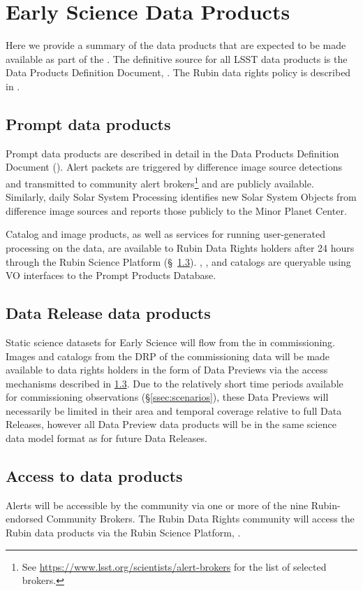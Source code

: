 \section{Early Science Data Products}
\label{sec:data}

Here we provide a summary of the data products that are expected to be made available as part of the \esp.
The definitive source for all LSST data products is the Data Products Definition Document, \citep{LSE-163}.
The Rubin data rights policy is described in  \cite{RDO-013}.


\subsection{Prompt data products}

Prompt data products are described in detail in the Data Products Definition Document (\DPDD).
Alert packets are triggered by difference image source detections and transmitted to community alert brokers\footnote{See \url{https://www.lsst.org/scientists/alert-brokers} for the list of selected brokers.} and are publicly available.
Similarly, daily Solar System Processing identifies new Solar System Objects from difference image sources and reports those publicly to the Minor Planet Center.

Catalog and image products, as well as services for running user-generated processing on the data, are available to Rubin Data Rights holders after 24 hours through the Rubin Science Platform (\S~\ref{ssec:dataaccess}).
\DIASource, \DIAObject, and \SSObject catalogs are queryable using VO interfaces to the Prompt Products Database.

\subsection{Data Release data products}
Static science datasets for Early Science will flow from the \svs in commissioning.
Images and catalogs from the DRP of the commissioning data will be made available to data rights holders in the form of Data Previews via the access mechanisms described in \ref{ssec:dataaccess}.
Due to the relatively short time periods available for commissioning observations (\S \ref{ssec:scenarios}), these Data Previews will necessarily be limited in their area and temporal coverage relative to full Data Releases, however all Data Preview data products will be in the same science data model format as for future Data Releases.

\subsection{Access to \es data products}\label{ssec:dataaccess}
Alerts will be accessible by the community via one or more of the nine Rubin-endorsed Community Brokers.
The Rubin Data Rights community will access the Rubin data products via the Rubin Science Platform, \citep{LSE-319}.
